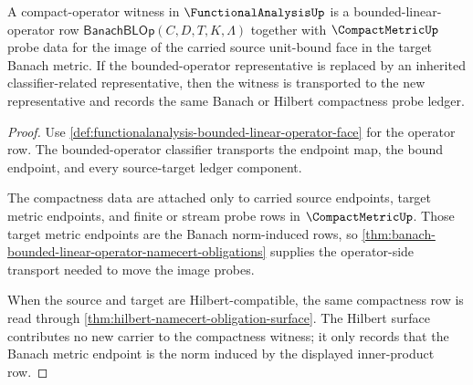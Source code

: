 \begin{theorem}
\label{thm:functionalanalysis-compact-operator-witness-obligation}
A compact-operator witness in $\FunctionalAnalysisUp$ is a
bounded-linear-operator row
$\mathsf{BanachBLOp}(C,D,T,K,\Lambda)$ together with
$\CompactMetricUp$ probe data for the image of the carried source unit-bound
face in the target Banach metric. If the bounded-operator representative is
replaced by an inherited classifier-related representative, then the witness
is transported to the new representative and records the same Banach or
Hilbert compactness probe ledger.
\end{theorem}
\begin{proof}
Use \autoref{def:functionalanalysis-bounded-linear-operator-face} for the
operator row. The bounded-operator classifier transports the endpoint map,
the bound endpoint, and every source-target ledger component.

The compactness data are attached only to carried source endpoints, target
metric endpoints, and finite or stream probe rows in $\CompactMetricUp$.
Those target metric endpoints are the Banach norm-induced rows, so
\autoref{thm:banach-bounded-linear-operator-namecert-obligations} supplies the
operator-side transport needed to move the image probes.

When the source and target are Hilbert-compatible, the same compactness row is
read through \autoref{thm:hilbert-namecert-obligation-surface}. The Hilbert
surface contributes no new carrier to the compactness witness; it only records
that the Banach metric endpoint is the norm induced by the displayed
inner-product row.
\end{proof}

